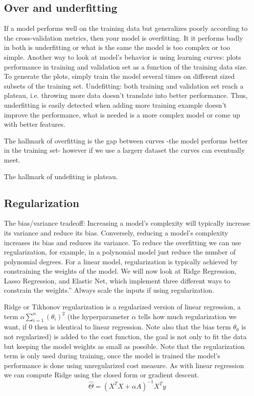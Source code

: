 \documentclass[12pt]{report}
\begin{document}
\subsection{Over and underfitting}
If a model performs well on the training data but generalizes poorly according to the cross-validation metrics, then your model is overfitting. It it performs badly in both is underfitting or what is the same the model is too complex or too simple. Another way to look at model's behavior is using learning curves: plots performance in training and validation set as a function of the training data size. To generate the plots, simply train the model several times on different sized subsets of the training set.
Undefitting: both training and validation set reach a plateau, i.e. throwing more data doesn't translate into better performance.
Thus, underfitting is easily detected when adding more training example doesn't improve the performance, what is needed is a more complex model or come up with better features.

The hallmark of overfitting is the gap between curves -the model performs better in the training set- however if we use a largerr dataset the curves can eventually meet.

The hallmark of undefiting is plateau.


\subsection{Regularization}
The bias/variance tradeoff: Increasing a model’s complexity will typically increase its variance and reduce its bias. Conversely, reducing a model’s complexity increases its bias and reduces its variance. To reduce the overfitting we can use regularization, for example, in a polynomial model just reduce the number of polynomial degrees.
For a linear model, regularization is typically achieved by constraining the weights of the model. We will now look at Ridge Regression, Lasso Regression, and Elastic Net, which implement three different ways to constrain the weights.”
Always scale the inputs if using regularization.


Ridge or Tikhonov regularization is a regularized version of linear regression, a term $\alpha \sum_{i=1}^{n}(\theta_i)^2$ (the hyperparameter $\alpha$ tells how much regularization we want, if 0 then is identical to linear regression. Note also that the bias term $\theta_0$ is not regularized) is added to the cost function, the goal is not only to fit the data but keeping the model weights as small as possible. Note that the regularization term is only used during training, once the model is trained the model's performance is done using unregularized cost measure.
As with linear regression we can compute Ridge using the closed form or gradient descent.
\begin{equation}
\hat{\Theta} = (X^{T}X + \alpha A)^{-1}X^{T}y
\end{equation}
\end{document}
